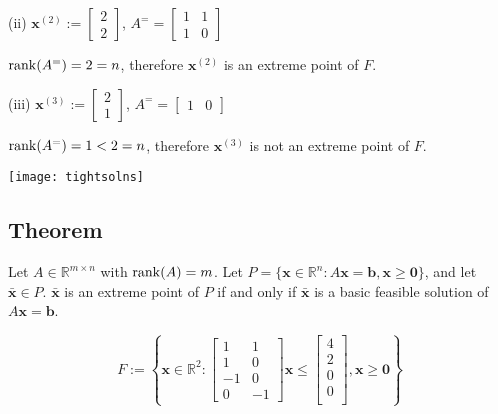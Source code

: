 (ii)
$\bm{x}^{(2)}:=\begin{bmatrix}2\\2\end{bmatrix}$,
$ A^= =
\begin{bmatrix}
    1 & 1\\
    1 & 0
\end{bmatrix} $

$ \operatorname{rank}(A^=)=2=n $, therefore $\bm{x}^{(2)}$ is an extreme
point of $ F $.

(iii)
$\bm{x}^{(3)}:=\begin{bmatrix}2\\1\end{bmatrix}$,
$ A^= =
\begin{bmatrix}
    1 & 0
\end{bmatrix} $

$ \operatorname{rank}(A^=)=1<2=n $, therefore $\bm{x}^{(3)}$ is not an extreme
point of $ F $.

\begin{center}
    \texttt{[image: tightsolns]}
\end{center}

\begin{thmbox}
    \subsection{Theorem}
    Let $ A\in\mathbb{R}^{m\times n} $ with $ \operatorname{rank}(A)=m $. 
    Let $ P=\{\bm{x}\in\mathbb{R}^n: A \bm{x}=\bm{b},
    \bm{x}\ge \bm{0}\} $, and let $ \bm{\bar{x}}\in P $.
    $ \bm{\bar{x}} $ is an extreme point of $ P $ if and only if $ \bm{\bar{x}} $ is a basic feasible solution of $  A \bm{x}=\bm{b} $.
\end{thmbox}

\[ F:=\left\{ \bm{x}\in\mathbb{R}^2: \begin{bmatrix}
    1 & 1\\
    1 & 0\\
    -1 & 0\\
    0 & -1
\end{bmatrix}\bm{x}\le
\begin{bmatrix}
    4\\
    2\\
    0\\
    0\\
\end{bmatrix}, \bm{x}\ge \bm{0} \right\} \]

